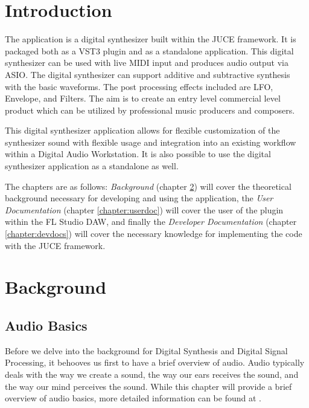 \documentclass[a4paper,12pt]{report}
\begin{document}



\vspace*{\fill}
\begin{center}

\end{center}
\vfill
\thispagestyle{empty}
\newpage
\setcounter{page}{1}

\tableofcontents

\chapter{Introduction}
\label{chapter:intro}

The application is a digital synthesizer built within the JUCE framework. It is packaged both as a VST3 plugin and as a standalone application. This digital synthesizer can be used with live MIDI input and produces audio output via ASIO. The digital synthesizer can support additive and subtractive synthesis with the basic waveforms. The post processing effects included are LFO, Envelope, and Filters. The aim is to create an entry level commercial level product which can be utilized by professional music producers and composers.

This digital synthesizer application allows for flexible customization of the synthesizer sound with flexible usage and integration into an existing workflow within a Digital Audio Workstation. It is also possible to use the digital synthesizer application as a standalone as well.

The chapters are as follows: \emph{Background} (chapter \ref{chapter:background}) will cover the theoretical background necessary for developing and using the application, the \emph{User Documentation} (chapter \ref{chapter:userdoc}) will cover the user of the plugin within the FL Studio DAW, and finally the \emph{Developer Documentation} (chapter \ref{chapter:devdocs}) will cover the necessary knowledge for implementing the code with the JUCE framework.


\chapter{Background}
\label{chapter:background}
\section{Audio Basics}
\label{sec:audiobasics}
Before we delve into the background for Digital Synthesis and Digital Signal Processing, it behooves us first to have a brief overview of audio. Audio typically deals with the way we create a sound, the way our ears receives the sound, and the way our mind perceives the sound. While this chapter will provide a brief overview of audio basics, more detailed information can be found at \cite{beginneraudiosynthesis}.
\end{document}
